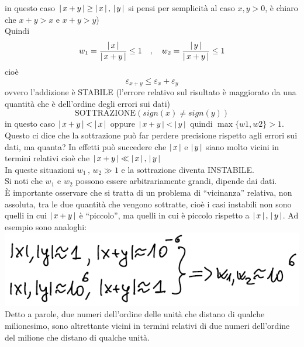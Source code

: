 \documentclass[12pt]{article}
\DeclarePairedDelimiter{\abs}{\lvert}{\rvert}
\begin{document}
in questo caso $\abs{\,x + y\,} \ge \abs{\,x\,}\,,\,\abs{\,y\,}$ si pensi per semplicità al caso $x,y > 0$, è chiaro che $x + y > x$ e $x + y > y$) \\
Quindi
\[w_1 = \frac{\abs*{\,x\,}}{\abs*{\,x + y\,}} \le 1 \quad , \quad w_2 = \frac{\abs*{\,y\,}}{\abs*{\,x + y\,}} \le 1\]
cioè \[\varepsilon_{x+y} \le \varepsilon_x + \varepsilon_y\]
ovvero l’addizione è STABILE (l’errore relativo sul risultato è maggiorato da una quantità che è dell'ordine degli errori sui dati)
\[\text{SOTTRAZIONE} (sign(x) \ne sign(y))\]
in questo caso $\abs{\,x + y\,} < \abs{\,x\,}$ oppure $\abs{\,x + y\,} < \abs{\,y\,}$ quindi $\max \{w1 , w2\} > 1$. \\
Questo ci dice che la sottrazione può far perdere precisione rispetto agli errori sui dati, ma quanta? In effetti può succedere che $\abs{\,x\,}$ e $\abs{\,y\,}$ siano molto vicini in termini relativi cioè che $\abs{\,x + y\,} \ll \abs{\,x\,}\,,\,\abs{\,y\,}$ \\
In queste situazioni $w_1\,,\,w_2 \gg 1$ e la sottrazione diventa INSTABILE.\\
Si noti che $w_1$ e $w_2$ possono essere arbitrariamente grandi, dipende dai dati.\\
È importante osservare che si tratta di un problema di “vicinanza” relativa, non assoluta, tra le due quantità che vengono sottratte, cioè i casi instabili non sono quelli in cui $\abs{\,x + y\,}$ è “piccolo”, ma quelli in cui è piccolo rispetto a $\abs{\,x\,}\,,\,\abs{\,y\,}$.
Ad esempio sono analoghi: \newline
\includegraphics[width=\linewidth]{img12}
Detto a parole, due numeri dell'ordine delle unità che distano di qualche milionesimo, sono altrettante vicini in termini relativi di due numeri dell'ordine del milione che distano di qualche unità.
\end{document}
